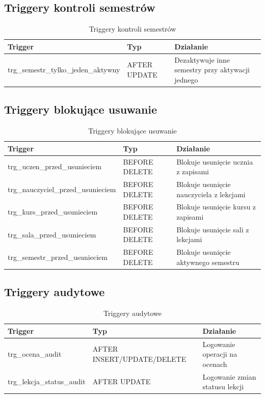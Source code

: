 \documentclass[12pt,a4paper]{article}
\begin{document}
\subsection{Triggery kontroli semestrów}

\begin{table}[h]
\centering
\begin{tabular}{|l|l|p{5cm}|}
\hline
\textbf{Trigger} & \textbf{Typ} & \textbf{Działanie} \\
\hline
trg\_semestr\_tylko\_jeden\_aktywny & AFTER UPDATE & Dezaktywuje inne semestry przy aktywacji jednego \\
\hline
\end{tabular}
\caption{Triggery kontroli semestrów}
\end{table}

\subsection{Triggery blokujące usuwanie}

\begin{table}[h]
\centering
\begin{tabular}{|l|l|p{5cm}|}
\hline
\textbf{Trigger} & \textbf{Typ} & \textbf{Działanie} \\
\hline
trg\_uczen\_przed\_usunieciem & BEFORE DELETE & Blokuje usunięcie ucznia z zapisami \\
trg\_nauczyciel\_przed\_usunieciem & BEFORE DELETE & Blokuje usunięcie nauczyciela z lekcjami \\
trg\_kurs\_przed\_usunieciem & BEFORE DELETE & Blokuje usunięcie kursu z zapisami \\
trg\_sala\_przed\_usunieciem & BEFORE DELETE & Blokuje usunięcie sali z lekcjami \\
trg\_semestr\_przed\_usunieciem & BEFORE DELETE & Blokuje usunięcie aktywnego semestru \\
\hline
\end{tabular}
\caption{Triggery blokujące usuwanie}
\end{table}

\subsection{Triggery audytowe}

\begin{table}[h]
\centering
\begin{tabular}{|l|l|p{5cm}|}
\hline
\textbf{Trigger} & \textbf{Typ} & \textbf{Działanie} \\
\hline
trg\_ocena\_audit & AFTER INSERT/UPDATE/DELETE & Logowanie operacji na ocenach \\
trg\_lekcja\_status\_audit & AFTER UPDATE & Logowanie zmian statusu lekcji \\
\hline
\end{tabular}
\caption{Triggery audytowe}
\end{table}
\end{document}
